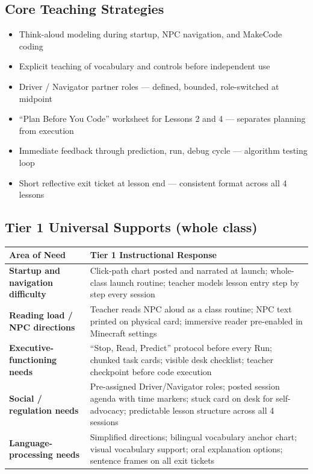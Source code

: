 \documentclass[12pt]{article}
\newcommand{\arow}{\rowcolor{altRow}}
\begin{document}
\subsection{Core Teaching Strategies}

\begin{itemize}
\item Think-aloud modeling during startup, NPC navigation, and MakeCode coding
\item Explicit teaching of vocabulary and controls before independent use
\item Driver / Navigator partner roles --- defined, bounded, role-switched at midpoint
\item ``Plan Before You Code'' worksheet for Lessons 2 and 4 --- separates planning from execution
\item Immediate feedback through prediction, run, debug cycle --- algorithm testing loop
\item Short reflective exit ticket at lesson end --- consistent format across all 4 lessons
\end{itemize}

\subsection{Tier 1 Universal Supports (whole class)}

\begin{tabularx}{\textwidth}{|>{\bfseries\color{brickRed}}P{2.1in}|L|}
\hline
{}\color{white}\bfseries Area of Need & \color{white}\bfseries Tier 1 Instructional Response \\
\hline
Startup and navigation difficulty & Click-path chart posted and narrated at launch; whole-class launch routine; teacher models lesson entry step by step every session \\
\hline
\arow Reading load / NPC directions & Teacher reads NPC aloud as a class routine; NPC text printed on physical card; immersive reader pre-enabled in Minecraft settings \\
\hline
Executive-functioning needs & ``Stop, Read, Predict'' protocol before every Run; chunked task cards; visible desk checklist; teacher checkpoint before code execution \\
\hline
\arow Social / regulation needs & Pre-assigned Driver/Navigator roles; posted session agenda with time markers; stuck card on desk for self-advocacy; predictable lesson structure across all 4 sessions \\
\hline
Language-processing needs & Simplified directions; bilingual vocabulary anchor chart; visual vocabulary support; oral explanation options; sentence frames on all exit tickets \\
\hline
\end{tabularx}
\end{document}
